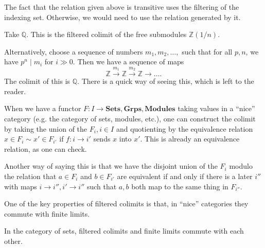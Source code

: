 The fact that the relation given above is transitive uses the filtering of the
indexing set. Otherwise, we would need to use the relation generated by it.

\begin{example}
Take $\mathbb{Q}$. This is the filtered colimit of the free submodules
$\mathbb{Z}(1/n)$.

Alternatively, choose a sequence of numbers $m_1 , m_2, \dots, $ such that for
all $p, n$, we have $p^n \mid m_i$ for $i \gg 0$. Then we have a sequence of
maps
\[ \mathbb{Z} \stackrel{m_1}{\to} \mathbb{Z} \stackrel{m_2}{\to}\mathbb{Z}
\to \dots.   \]
The colimit of this is $\mathbb{Q}$. There is a quick way of seeing this, which
is left to the reader.
\end{example}

When we have a functor $F: I \to \mathbf{Sets}, \mathbf{Grps},
\mathbf{Modules}$ taking values in a ``nice'' category (e.g. the category of
sets, modules, etc.), one can construct the colimit by taking the union of the
$F_i, i \in I$ and quotienting by the equivalence relation $x \in F_i \sim x'
\in F_{i'}$ if $f: i \to i'$ sends $x$ into $x'$. This is already an
equivalence relation, as one can check.

Another way of saying this is that we have the disjoint union of the $F_i$
modulo the relation that $a \in F_i$ and $b \in F_{i'}$ are equivalent if and
only if there is a later $i''$ with maps $i \to i'', i' \to i''$ such that
$a,b$ both map to the same thing in $F_{i''}$.


One of the key properties of filtered colimits is that, in ``nice'' categories they commute with
finite limits.

\begin{proposition} 
In the category of sets, filtered colimits and finite limits commute with each
other.
\end{proposition} 

